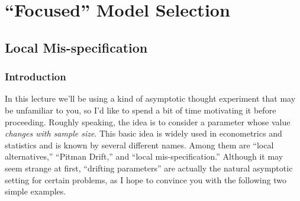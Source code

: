 \chapter{``Focused'' Model Selection}
\section{Local Mis-specification}

\subsection{Introduction}
In this lecture we'll be using a kind of asymptotic thought experiment that may be unfamiliar to you, so I'd like to spend a bit of time motivating it before proceeding. 
Roughly speaking, the idea is to consider a parameter whose value \emph{changes with sample size}. 
This basic idea is widely used in econometrics and statistics and is known by several different names. 
Among them are ``local alternatives,'' ``Pitman Drift,'' and ``local mis-specification.'' 
Although it may seem strange at first, ``drifting parameters'' are actually the natural asymptotic setting for certain problems, as I hope to convince you with the following two simple examples.

